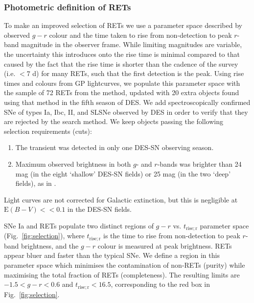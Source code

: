 \documentclass[fleqn,usenatbib,]{mnras}
\newcommand{\replyref}[1]{\color{magenta}#1 \color{black}}
\begin{document}
\subsubsection{Photometric definition of RETs \label{subsubsec:trise_gr}}
To make an improved selection of RETs we use a parameter space described by observed $g-r$ colour and the time taken to rise from non-detection to peak $r$-band magnitude in the observer frame. \replyref{While limiting magnitudes are variable, the uncertainty this introduces onto the rise time is minimal compared to that caused by the fact that the rise time is shorter than the cadence of the survey (i.e. $<7$ d) for many RETs, such that the first detection is the peak.} Using rise times and colours from GP lightcurves, we populate this parameter space with the sample of 72 RETs from the  method, updated with 20 extra objects found using that method in the fifth season of DES. We add spectroscopically confirmed SNe of types Ia, Ibc, II, and SLSNe observed by DES in order to verify that they are rejected by the search method. We keep objects passing the following selection requirements (cuts):
\begin{enumerate}
\item The transient was detected in only one DES-SN observing season.
\item Maximum observed brightness in both $g$- and $r$-bands was brighter than 24 mag (in the eight `shallow' DES-SN fields) or 25 mag (in the two `deep' fields), as in .
\end{enumerate}

\replyref{Light curves are not corrected for Galactic extinction, but this is negligible at $\mathrm{E}(B-V)<<0.1$ in the DES-SN fields.}

 SNe Ia and RETs populate two distinct regions of $g-r$ vs. $t_{\mathrm{rise; r}}$ parameter space (Fig.~\ref{fig:selection}), where $t_{\mathrm{rise; r}}$ is the time to rise from non-detection to peak $r$-band brightness, and the $g-r$ colour is measured at peak brightness. RETs appear bluer and faster than the typical SNe. We define a region in this parameter space which minimises the contamination of non-RETs (purity) while maximising the total fraction of RETs (completeness). The resulting limits are $-1.5 < g-r < 0.6 $ and $t_{\mathrm{rise; r}} <16.5$, corresponding to the red box in Fig.~\ref{fig:selection}.
\end{document}
